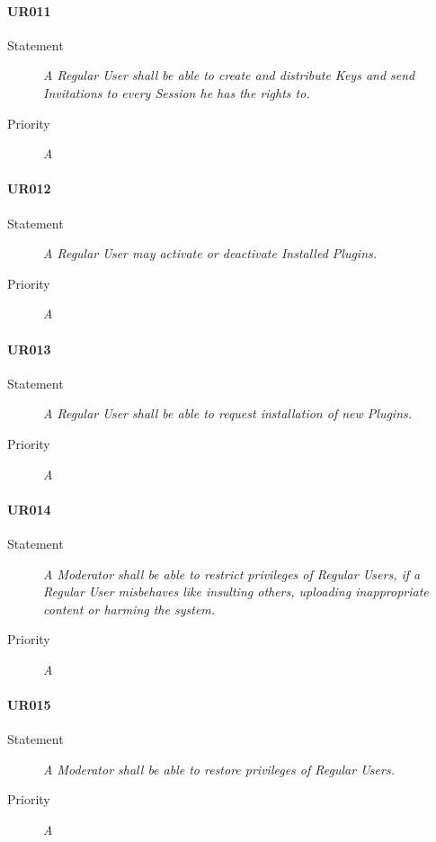 \paragraph{UR011}
\begin{description}
  \item [Statement] 
    \textit{A \gls{Regular User} shall be able to create and distribute \gls{Keys} and send \gls{Invitations} to every \gls{Session} he has the rights to.}
  \item [Priority] \textit{A}
\end{description}

\paragraph{UR012}
\begin{description}
  \item [Statement] 
    \textit{A \gls{Regular User} may activate or deactivate \gls{Installed Plugins}.}
  \item [Priority] \textit{A}
\end{description}

\paragraph{UR013}
\begin{description}
  \item [Statement] 
    \textit{A \gls{Regular User} shall be able to request installation of new \gls{Plugins}.}
  \item [Priority] \textit{A}
\end{description}

\paragraph{UR014}
\begin{description}
  \item [Statement] 
    \textit{A \gls{Moderator} shall be able to restrict privileges of \gls{Regular User}s, if a \gls{Regular User} misbehaves like insulting others, uploading inappropriate content or harming the system.}
  \item [Priority] \textit{A}
\end{description}

\paragraph{UR015}
\begin{description}
  \item [Statement] 
    \textit{A \gls{Moderator} shall be able to restore privileges of \gls{Regular User}s.}
  \item [Priority] \textit{A}
\end{description}

